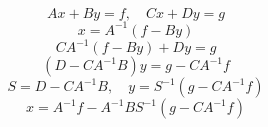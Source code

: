\documentclass{article}
\begin{document}
\[
Ax+By=f,\quad Cx+Dy=g
\]
\[
x=A^{-1}(f-By)
\]
\[
CA^{-1}(f-By)+Dy=g
\]
\[
(D-CA^{-1}B)y=g-CA^{-1}f
\]
\[
S=D-CA^{-1}B,\quad y=S^{-1}(g-CA^{-1}f)
\]
\[
x=A^{-1}f-A^{-1}BS^{-1}(g-CA^{-1}f)
\]
\end{document}
